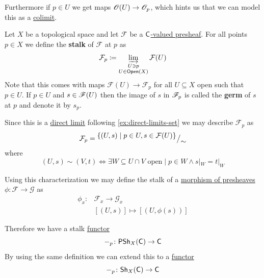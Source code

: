 \documentclass[../../main]{subfiles}
\begin{document}
Furthermore if \(p \in U\) we get maps \(\mathscr{O}(U) \to \mathscr{O}_{p}\), which hints us that we can model this as a \hyperref[def:categorical-colimit]{colimit}.
\begin{definition}\label{def:stalk}
  Let \(X\) be a topological space and let \(\mathcal{F}\) be a \hyperref[def:presheaf]{\(\mathsf{C}\)-valued presheaf}.
  For all points \(p \in X\) we define the \textbf{stalk} of \(\mathcal{F}\) at \(p\) as
  \begin{equation*}
    \mathcal{F}_{p} \coloneq \varinjlim_{\substack{U \ni p \\ U \in \mathsf{Open}(X)}} \mathcal{F}(U)
  \end{equation*}
  Note that this comes with maps \(\mathcal{F}(U) \to \mathcal{F}_{p}\) for all \(U \subseteq X\) open such that \(p \in U\).
  If \(p \in U\) and \(s \in \mathscr{F}(U)\) then the image of \(s\) in \(\mathscr{F}_{p}\) is called the \textbf{germ} of \(s\) at \(p\) and denote it by \(s_{p}\).
  
  Since this is a \hyperref[def:direct-limit]{direct limit} following \autoref{ex:direct-limits-set} we may describe \(\mathcal{F}_{p}\) as
  \begin{equation*}
    \mathcal{F}_{p} = {^{\textstyle \{ (U, s) \mid p \in U, s \in \mathcal{F}(U)\}}\big/_{\textstyle \sim}}
  \end{equation*}
  where
  \begin{equation*}
    (U, s) \sim (V, t) \iff \exists W \subseteq U \cap V \text{ open} \mid p \in W \land s|_{W} = t|_{W}
  \end{equation*}
  
  Using this characterization we may define the stalk of a \hyperref[def:presheaf]{morphism of presheaves} \(\phi: \mathcal{F} \to \mathcal{G}\) as
  \begin{align*}
    \phi_{x}\colon& \mathcal{F}_{x} \to \mathcal{G}_{x} \\
            & [(U, s)] \mapsto [(U, \phi(s))]
  \end{align*}

  Therefore we have a stalk \hyperref[def:functor]{functor}
  \begin{equation*}
    -_{p}\colon \mathsf{PSh}_{X}(\mathsf{C}) \to \mathsf{C}
  \end{equation*}
  By using the same definition we can extend this to a \hyperref[def:functor]{functor}
  \begin{equation*}
    -_{p}\colon \mathsf{Sh}_{X}(\mathsf{C}) \to \mathsf{C}
  \end{equation*}
\end{definition}
\end{document}

